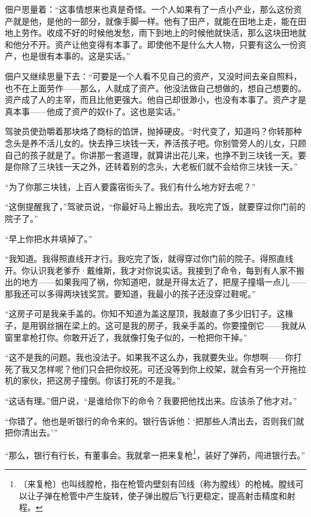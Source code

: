 \documentclass[12pt,UTF-8,openany]{ctexbook}
\begin{document}
\begin{normalsize}
    佃户思量着：“这事情想来也真是奇怪。一个人如果有了一点小产业，那么这份资产就是他，是他的一部分，就像手脚一样。他有了田产，就能在田地上走，能在田地上劳作。收成不好的时候他发愁，雨下到地上的时候他就快活，那么这块田地就和他分不开。资产让他变得有本事了。即使他不是什么大人物，只要有这么一份资产，也是很有本事的。这是实话。”
    
    佃户又继续思量下去：“可要是一个人看不见自己的资产，又没时间去亲自照料，也不在上面劳作——那么，人就成了资产。他没法做自己想做的，想自己想要的。资产成了人的主宰，而且比他更强大。他自己却很渺小，也没有本事了。资产才是真本事——他成了资产的奴仆了。这也是实话。”
    
    驾驶员使劲嚼着那块烙了商标的馅饼，抛掉硬皮。“时代变了，知道吗？你转那种念头是养不活儿女的。快去挣三块钱一天，养活孩子吧。你别管旁人的儿女，只顾自己的孩子就是了。你讲那一套道理，就算讲出花儿来，也挣不到三块钱一天。要是你除了三块钱一天之外，还转着别的念头，大老板们就不会给你三块钱一天。”
    
    “为了你那三块钱，上百人要露宿街头了。我们有什么地方好去呢？”
    
    “这倒提醒我了，”驾驶员说，“你最好马上搬出去。我吃完了饭，就要穿过你门前的院子了。”
    
    “早上你把水井填掉了。”
    
    “我知道。我得照直线开才行。我吃完了饭，就得穿过你门前的院子。得照直线开。你认识我老爹乔·戴维斯，我才对你说实话。我接到了命令，每到有人家不搬出的地方——如果我闯了祸，你知道吧，就是开得太近了，把屋子撞塌一点儿——那我还可以多得两块钱奖赏。要知道，我最小的孩子还没穿过鞋呢。”
    
    “这房子可是我亲手盖的。你知不知道为盖这屋顶，我敲直了多少旧钉子。这椽子，是用钢丝捆在梁上的。这可是我的房子，我亲手盖的。你要撞倒它——我就从窗里拿枪打你。你敢开近了，我就像打兔子似的，一枪把你干掉。”
    
    “这不是我的问题。我也没法子。如果我不这么办，我就要失业。你想啊——你打死了我又怎样呢？他们只会把你绞死。可还没等到你上绞架，就会有另一个开拖拉机的家伙，把这房子撞倒。你该打死的不是我。”
    
    “这话有理。”佃户说，“是谁给你下的命令？我要把他找出来。应该杀了他才对。”
    
    “你错了。他也是听银行的命令来的。银行告诉他：‘把那些人清出去，否则我们就把你清出去。’”
    
    “那么，银行有行长，有董事会。我就拿一把来复枪\footnote{〔来复枪〕也叫线膛枪，指在枪管内壁刻有凹线（称为膛线）的枪械。膛线可以让子弹在枪管中产生旋转，使子弹出膛后飞行更稳定，提高射击精度和射程。}，装好了弹药，闯进银行去。”
    

\end{normalsize}
\end{document}
